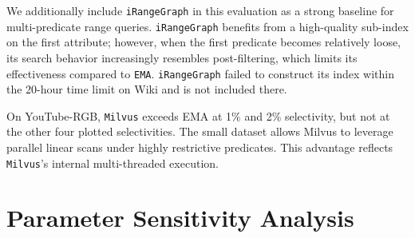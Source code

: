 We additionally include \texttt{iRangeGraph} in this evaluation as a strong baseline for multi-predicate range queries. \texttt{iRangeGraph} benefits from a high-quality sub-index on the first attribute; however, when the first predicate becomes relatively loose, its search behavior increasingly resembles post-filtering, which limits its effectiveness compared to \texttt{EMA}. 
\texttt{iRangeGraph} failed to construct its index within the 20-hour time limit on Wiki and is not included there.


On YouTube-RGB, \texttt{Milvus} exceeds EMA at 1\% and 2\% selectivity, but not at the other four plotted selectivities.
The small dataset allows Milvus to leverage parallel linear scans under highly restrictive predicates.
This advantage reflects \texttt{Milvus}'s internal multi-threaded execution.





\section{Parameter Sensitivity Analysis}

